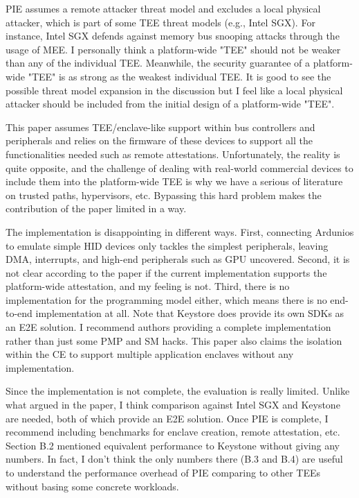 PIE assumes a remote attacker threat model and excludes a local physical attacker, which is part of some TEE threat models (e.g., Intel SGX). For instance, Intel SGX defends against memory bus snooping attacks through the usage of MEE. I personally think a platform-wide "TEE" should not be weaker than any of the individual TEE. Meanwhile, the security guarantee of a platform-wide "TEE" is as strong as the weakest individual TEE. It is good to see the possible threat model expansion in the discussion but I feel like a local physical attacker should be included from the initial design of a platform-wide "TEE".

This paper assumes TEE/enclave-like support within bus controllers and peripherals and relies on the firmware of these devices to support all the functionalities needed such as remote attestations. Unfortunately, the reality is quite opposite, and the challenge of dealing with real-world commercial devices to include them into the platform-wide TEE is why we have a serious of literature on trusted paths, hypervisors, etc. Bypassing this hard problem makes the contribution of the paper limited in a way.

The implementation is disappointing in different ways. First, connecting Ardunios to emulate simple HID devices only tackles the simplest peripherals, leaving DMA, interrupts, and high-end peripherals such as GPU uncovered. Second, it is not clear according to the paper if the current implementation supports the platform-wide attestation, and my feeling is not. Third, there is no implementation for the programming model either, which means there is no end-to-end implementation at all. Note that Keystore does provide its own SDKs as an E2E solution. I recommend authors providing a complete implementation rather than just some PMP and SM hacks. This paper also claims the isolation within the CE to support multiple application enclaves without any implementation.

Since the implementation is not complete, the evaluation is really limited. Unlike what argued in the paper, I think comparison against Intel SGX and Keystone are needed, both of which provide an E2E solution. Once PIE is complete, I recommend including benchmarks for enclave creation, remote attestation, etc. Section B.2 mentioned equivalent performance to Keystone without giving any numbers. In fact, I don't think the only numbers there (B.3 and B.4) are useful to understand the performance overhead of PIE comparing to other TEEs without basing some concrete workloads.

